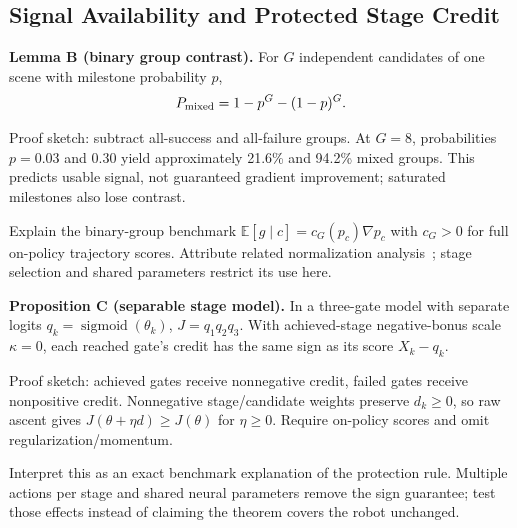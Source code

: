 \subsection{Signal Availability and Protected Stage Credit}
\begin{outline}
\item \textbf{Lemma B (binary group contrast).} For $G$ independent candidates of one scene with milestone probability $p$,
\begin{equation}
P_{\rm mixed}=1-p^G-(1-p)^G.
\end{equation}
\item Proof sketch: subtract all-success and all-failure groups. At $G=8$, probabilities $p=0.03$ and $0.30$ yield approximately 21.6\% and 94.2\% mixed groups. This predicts usable signal, not guaranteed gradient improvement; saturated milestones also lose contrast.
\item Explain the binary-group benchmark $\mathbb E[\widehat g\mid c]=c_G(p_c)\nabla p_c$ with $c_G>0$ for full on-policy trajectory scores. Attribute related normalization analysis~\cite{mroueh2026,bay2026}; stage selection and shared parameters restrict its use here.
\item \textbf{Proposition C (separable stage model).} In a three-gate model with separate logits $q_k=\operatorname{sigmoid}(\theta_k)$, $J=q_1q_2q_3$. With achieved-stage negative-bonus scale $\kappa=0$, each reached gate's credit has the same sign as its score $X_k-q_k$.
\item Proof sketch: achieved gates receive nonnegative credit, failed gates receive nonpositive credit. Nonnegative stage/candidate weights preserve $d_k\ge0$, so raw ascent gives $J(\theta+\eta d)\ge J(\theta)$ for $\eta\ge0$. Require on-policy scores and omit regularization/momentum.
\item Interpret this as an exact benchmark explanation of the protection rule. Multiple actions per stage and shared neural parameters remove the sign guarantee; test those effects instead of claiming the theorem covers the robot unchanged.
\end{outline}
